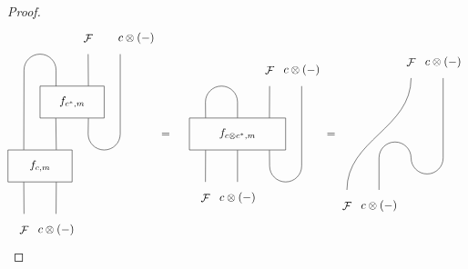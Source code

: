\documentclass{amsart}
\begin{document}
\begin{proof}
$$\cb{\begin{tikzpicture}
	\node (A) at (2,2) [minimum height=1cm,minimum width=2cm, draw] {$f_{c^*,m}$};
	\node (B) at (1,0) [minimum height=1cm,minimum width=2cm, draw] {$f_{c,m}$};
	\draw (B.135) -- (.5,3) arc (180:0:0.5cm) |- (A.135) ;
	\draw (A.225) -- (B.45);
	\draw (A.45) -- (2.5,3.5);
	\draw (A.315) -- (2.5,1) arc (180:360:0.5cm) -- (3.5,3.5);
	\draw (B.315) -- (1.5, -1.5);
	\draw (B.225) -- (.5, -1.5);
	\node at (2.5,4) {$\cF$};
	\node at (4,4) {$c \otimes (-)$};
	\node at (.5, -2) {$\cF$};
	\node at (1.5, -2) {$c \otimes (-)$};
\end{tikzpicture}}
= \hspace{.5cm} \cb{\begin{tikzpicture}
	\node (A) at (2,2) [minimum height=1cm,minimum width=3cm, draw] {$f_{c \otimes c^*,m}$};
	\draw (A.153) -- (1,3) arc (180:0:0.5cm) -- (A.90) ;
	\draw (A.27) -- (3,3.5);
	\draw (A.333) -- (3,1) arc (180:360:0.5cm) -- (4, 3.5);
	\draw (A. 270) -- (2,.5);
	\draw (A.207) -- (1,.5);
	\node at (3,4) {$\cF$};
	\node at (4,4) {$c \otimes (-)$};
	\node at (1,0) {$\cF$};
	\node at (2,0) {$c \otimes (-)$};
\end{tikzpicture}}
=
\cb{\begin{tikzpicture}
	\draw (0, 0) to [out=90, in=270] (2,3.5);
	\draw (1,0) -- (1,1) arc (180:0:.5cm) arc (180:360:.5cm) -- (3,3.5);
	\node at (2,4) {$\cF$};
	\node at (3,4) {$c \otimes (-)$};
	\node at (0,-.5) {$\cF$};
	\node at (1,-.5) {$c \otimes (-)$};
\end{tikzpicture}}
$$\end{proof}
\end{document}

